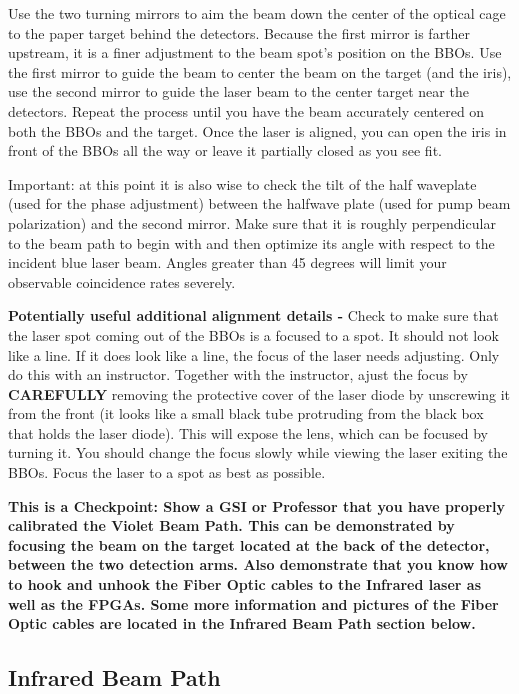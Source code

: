 \documentclass{../lab}
\begin{document}
Use the two turning mirrors to aim the beam down the center of the optical cage to the paper target behind the detectors. Because the first mirror is farther upstream, it is a finer adjustment to the beam spot's position on the BBOs. Use the first mirror to guide the beam to center the beam on the target (and the iris), use the second mirror to guide the laser beam to the center target near the detectors. Repeat the process until you have the beam accurately centered on both the BBOs and the target. Once the laser is aligned, you can open the iris in front of the BBOs all the way or leave it partially closed as you see fit.

Important: at this point it is also wise to check the tilt of the half waveplate (used for the phase adjustment) between the halfwave plate (used for pump beam polarization) and the second mirror. Make sure that it is roughly perpendicular to the beam path to begin with and then optimize its angle with respect to the incident blue laser beam. Angles greater than 45 degrees will limit your observable coincidence rates severely.

\textbf{Potentially useful additional alignment details -} Check to make sure that the laser spot coming out of the BBOs is a focused to a spot. It should not look like a line. If it does look like a line, the focus of the laser needs adjusting. Only do this with an instructor. Together with the instructor, ajust the focus by \textbf{CAREFULLY} removing the protective cover of the laser diode by unscrewing it from the front (it looks like a small black tube protruding from the black box that holds the laser diode). This will expose the lens, which can be focused by turning it. You should change the focus slowly while viewing the laser exiting the BBOs. Focus the laser to a spot as best as possible.


\textbf{This is a Checkpoint: Show a GSI or Professor that you have properly calibrated the Violet Beam Path. This can be demonstrated by focusing the beam on the target located at the back of the detector, between the two detection arms. Also demonstrate that you know how to hook and unhook the Fiber Optic cables to the Infrared laser as well as the FPGAs. Some more information and pictures of the Fiber Optic cables are located in the Infrared Beam Path section below.}

\subsection{Infrared Beam Path}
\end{document}
